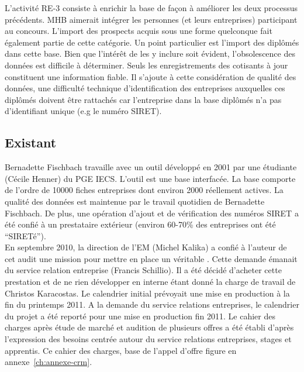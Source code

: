 \documentclass{book}
\begin{document}
L'activité RE-3 consiste à enrichir la base de façon à améliorer les deux
processus précédents. MHB aimerait intégrer les personnes (et leurs entreprises)
participant au concours. L'import des prospects acquis sous une forme quelconque
fait également partie de cette catégorie.
Un point particulier est l'import des diplômés dans cette base. Bien que l'intérêt 
de les y inclure soit évident, l'obsolescence des données est difficile à déterminer.
Seuls les enregistrements des cotisants à jour constituent une information fiable.
Il s'ajoute à cette considération de qualité des données, une difficulté technique
d'identification des entreprises auxquelles ces diplômés doivent être rattachés car
l'entreprise dans la base diplômés n'a pas d'identifiant unique (e.g le numéro SIRET).



\subsection{Existant}

Bernadette Fischbach travaille avec un outil développé en 2001 par 
une étudiante (Cécile Henner) du PGE IECS. L'outil est une base 
 interfacée. La base comporte de l'ordre de 10000 fiches 
entreprises dont environ 2000 réellement actives. La qualité
des données est maintenue par le travail quotidien de Bernadette
Fischbach. De plus, une opération d'ajout et de vérification des
numéros SIRET a été confié à un prestataire extérieur (environ
60-70\% des entreprises ont été ``SIRETé'').\\

En septembre 2010, la direction de l'EM (Michel Kalika) a confié
à l'auteur de cet audit une mission pour mettre en place un véritable
. Cette demande émanait du service relation entreprise (Francis 
Schillio). Il a été décidé d'acheter cette prestation et de ne rien 
développer en interne étant donné la charge de travail de Christos 
Karacostas. Le calendrier initial prévoyait une mise en production 
à la fin du printemps 2011. A la demande du service relations 
entreprises, le calendrier du projet a été reporté pour une mise en 
production fin 2011.
Le cahier des charges après étude de marché et audition de
plusieurs offres a été établi d'après l'expression des besoins
centrée autour du service relations entreprises, stages et apprentis.
Ce cahier des charges, base de l'appel d'offre figure en 
annexe~\ref{ch:annexe-crm}.\\
\end{document}
